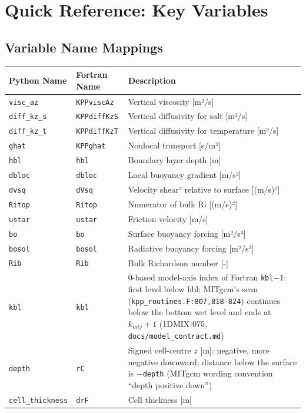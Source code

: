 \documentclass[11pt]{article}
\begin{document}
\section{Quick Reference: Key Variables}
\label{sec:variables}

\subsection{Variable Name Mappings}

\begin{table}[h]
\centering
\small
\begin{tabular}{llp{4.5cm}}
\toprule
\textbf{Python Name} & \textbf{Fortran Name} & \textbf{Description} \\
\midrule
\verb|visc_az| & \verb|KPPviscAz| & Vertical viscosity [m²/s] \\
\verb|diff_kz_s| & \verb|KPPdiffKzS| & Vertical diffusivity for salt [m²/s] \\
\verb|diff_kz_t| & \verb|KPPdiffKzT| & Vertical diffusivity for temperature [m²/s] \\
\verb|ghat| & \verb|KPPghat| & Nonlocal transport [s/m²] \\
\verb|hbl| & \verb|hbl| & Boundary layer depth [m] \\
\verb|dbloc| & \verb|dbloc| & Local buoyancy gradient [m/s²] \\
\verb|dvsq| & \verb|dVsq| & Velocity shear² relative to surface [(m/s)²] \\
\verb|Ritop| & \verb|Ritop| & Numerator of bulk Ri [(m/s)²] \\
\verb|ustar| & \verb|ustar| & Friction velocity [m/s] \\
\verb|bo| & \verb|bo| & Surface buoyancy forcing [m²/s³] \\
\verb|bosol| & \verb|bosol| & Radiative buoyancy forcing [m²/s³] \\
\verb|Rib| & \verb|Rib| & Bulk Richardson number [-] \\
\verb|kbl| & \verb|kbl| & 0-based model-axis index of Fortran \verb|kbl|$-1$: first level below hbl; MITgcm's scan (\verb|kpp_routines.F:807,818-824|) continues below the bottom wet level and ends at $k_{mtj}+1$ (1DMIX-075, \verb|docs/model_contract.md|) \\
\verb|depth| & \verb|rC| & Signed cell-centre $z$ [m]: negative, more negative downward; distance below the surface is $-$\verb|depth| (MITgcm wording convention ``depth positive down'') \\
\verb|cell_thickness| & \verb|drF| & Cell thickness [m] \\

\end{tabular}
\end{table}
\end{document}
